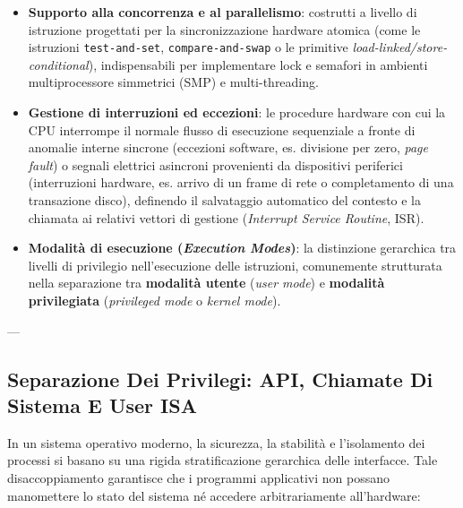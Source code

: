 \documentclass[11pt, a4paper]{article}
\begin{document}
\begin{itemize}
    \item \textbf{Supporto alla concorrenza e al parallelismo}: costrutti a livello di istruzione progettati per la sincronizzazione hardware atomica (come le istruzioni \texttt{test-and-set}, \texttt{compare-and-swap} o le primitive \emph{load-linked/store-conditional}), indispensabili per implementare lock e semafori in ambienti multiprocessore simmetrici (SMP) e multi-threading.
    \item \textbf{Gestione di interruzioni ed eccezioni}: le procedure hardware con cui la CPU interrompe il normale flusso di esecuzione sequenziale a fronte di anomalie interne sincrone (eccezioni software, es. divisione per zero, \emph{page fault}) o segnali elettrici asincroni provenienti da dispositivi periferici (interruzioni hardware, es. arrivo di un frame di rete o completamento di una transazione disco), definendo il salvataggio automatico del contesto e la chiamata ai relativi vettori di gestione (\emph{Interrupt Service Routine}, ISR).
    \item \textbf{Modalità di esecuzione (\emph{Execution Modes})}: la distinzione gerarchica tra livelli di privilegio nell'esecuzione delle istruzioni, comunemente strutturata nella separazione tra \textbf{modalità utente} (\emph{user mode}) e \textbf{modalità privilegiata} (\emph{privileged mode} o \emph{kernel mode}).
\end{itemize}

---

\subsection{Separazione Dei Privilegi: API, Chiamate Di Sistema E User ISA}

In un sistema operativo moderno, la sicurezza, la stabilità e l'isolamento dei processi si basano su una rigida stratificazione gerarchica delle interfacce. Tale disaccoppiamento garantisce che i programmi applicativi non possano manomettere lo stato del sistema né accedere arbitrariamente all'hardware:
\end{document}
